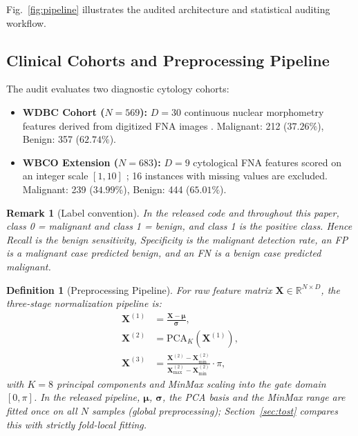 \documentclass[journal,twocolumn]{IEEEtran}
\newtheorem{definition}{Definition}
\newtheorem{remark}{Remark}
\begin{document}
Fig.~\ref{fig:pipeline} illustrates the audited architecture and statistical auditing workflow.

\subsection{Clinical Cohorts and Preprocessing Pipeline}

The audit evaluates two diagnostic cytology cohorts:
\begin{itemize}
    \item \textbf{WDBC Cohort ($N=569$):} $D=30$ continuous nuclear morphometry features derived from digitized FNA images \cite{street1993nuclear}. Malignant: 212 ($37.26\%$), Benign: 357 ($62.74\%$).
    \item \textbf{WBCO Extension ($N=683$):} $D=9$ cytological FNA features scored on an integer scale $[1, 10]$ \cite{wolberg1990multisurface}; 16 instances with missing values are excluded. Malignant: 239 ($34.99\%$), Benign: 444 ($65.01\%$).
\end{itemize}

\begin{remark}[Label convention]
In the released code and throughout this paper, class 0 = malignant and class 1 = benign, and class 1 is the positive class. Hence \emph{Recall} is the benign sensitivity, \emph{Specificity} is the malignant detection rate, an FP is a malignant case predicted benign, and an FN is a benign case predicted malignant.
\end{remark}

\begin{definition}[Preprocessing Pipeline]
For raw feature matrix $\mathbf{X} \in \mathbb{R}^{N \times D}$, the three-stage normalization pipeline is:
\begin{align}
    \mathbf{X}^{(1)} &= \frac{\mathbf{X} - \boldsymbol{\mu}}{\boldsymbol{\sigma}}, \label{eq:standardize} \\
    \mathbf{X}^{(2)} &= \text{PCA}_K(\mathbf{X}^{(1)}), \label{eq:pca} \\
    \mathbf{X}^{(3)} &= \frac{\mathbf{X}^{(2)} - \mathbf{X}^{(2)}_{\min}}{\mathbf{X}^{(2)}_{\max} - \mathbf{X}^{(2)}_{\min}} \cdot \pi, \label{eq:minmax}
\end{align}
with $K=8$ principal components and MinMax scaling into the gate domain $[0, \pi]$. In the released pipeline, $\boldsymbol{\mu}$, $\boldsymbol{\sigma}$, the PCA basis and the MinMax range are fitted once on all $N$ samples (global preprocessing); Section~\ref{sec:tost} compares this with strictly fold-local fitting.
\end{definition}
\end{document}
